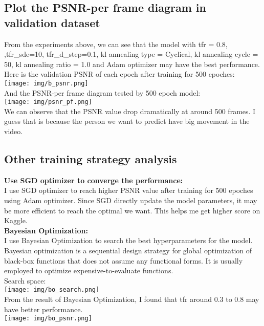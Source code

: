 \documentclass{article} %
\begin{document}
    \subsection{Plot the PSNR-per frame diagram in validation dataset}
    From the experiments above, we can see that the model with tfr = 0.8, ,tfr\_sde=10, tfr\_d\_step=0.1, kl annealing type = Cyclical, kl annealing cycle = 50, kl annealing ratio = 1.0 and Adam optimizer may have the best performance.\\
    Here is the validation PSNR of each epoch after training for 500 epoches:\\
    \texttt{[image: img/b\_psnr.png]}\\
    And the PSNR-per frame diagram tested by 500 epoch model:\\
    \texttt{[image: img/psnr\_pf.png]}\\
    We can observe that the PSNR value drop dramatically at around 500 frames.
    I guess that is because the person we want to predict have big movement in the video.\\ 
    \subsection{Other training strategy analysis}
    \textbf{Use SGD optimizer to converge the performance:}\\
    I use SGD optimizer to reach higher PSNR value after training for 500 epoches using Adam optimizer.
    Since SGD directly update the model parameters, it may be more efficient to reach the optimal we want.
    This helps me get higher score on Kaggle.\\
    \textbf{Bayesian Optimization:}\\
    I use Bayesian Optimization to search the best hyperparameters for the model.
    Bayesian optimization is a sequential design strategy for global optimization of black-box functions that does not assume any functional forms. It is usually employed to optimize expensive-to-evaluate functions.\\
    Search space:\\
    \texttt{[image: img/bo\_search.png]}\\
    From the result of Bayesian Optimization, I found that tfr around 0.3 to 0.8 may have better performance.\\
    \texttt{[image: img/bo\_psnr.png]}\\
    
   
\end{document}
